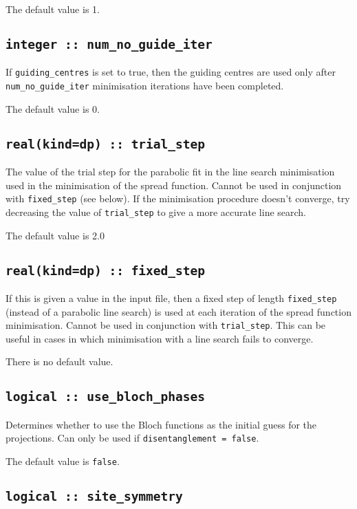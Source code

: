 The default value is 1.

\subsection[num\_no\_guide\_iter]{\tt integer :: num\_no\_guide\_iter}
If \verb#guiding_centres# is set to true, then the
guiding centres are used only after \verb#num_no_guide_iter#
minimisation iterations have been completed.

The default value is 0.

\subsection[trial\_step]{\tt real(kind=dp) :: trial\_step}
The value of the trial step for the parabolic fit in the line
search minimisation used in the minimisation of the spread
function. Cannot be used in conjunction with \verb#fixed_step# (see
below). If the minimisation procedure doesn't converge, try decreasing
the value of \verb#trial_step# to give a more accurate line search.

The default value is 2.0

\subsection[fixed\_step]{\tt real(kind=dp) :: fixed\_step}
If this is given a value in the input file, then a fixed step of length
\verb#fixed_step# (instead of a parabolic
line search) is used at each iteration of the spread function
minimisation. Cannot be used in conjunction with
\verb#trial_step#. This can be useful in cases in which minimisation
with a line search fails to converge.

There is no default value.

\subsection[use\_bloch\_phases]{\tt logical :: use\_bloch\_phases}

Determines whether to use the Bloch functions as the
initial guess for the projections. Can only be used if
\verb#disentanglement = false#. 

The default value is \verb#false#.


\subsection[site\_symmetry]{\tt logical :: site\_symmetry}

